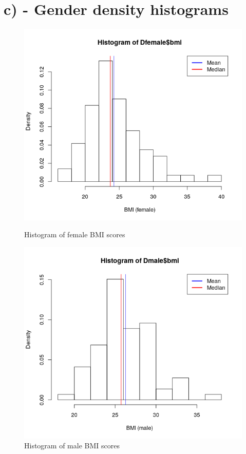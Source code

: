 \documentclass{memoir}
\begin{document}
\section{c) - Gender density histograms}
\begin{figure}[H]
	\centering
	\begin{minipage}{0.5\textwidth}
		\centering
		\includegraphics[width=1\textwidth]{femalehist.png}
		\caption{Histogram of female BMI scores}
	\end{minipage}\hfill
	\begin{minipage}{0.5\textwidth}
		\centering
		\includegraphics[width=1\textwidth]{malehist.png}
		\caption{Histogram of male BMI scores}
	\end{minipage}
\end{figure}
\end{document}
